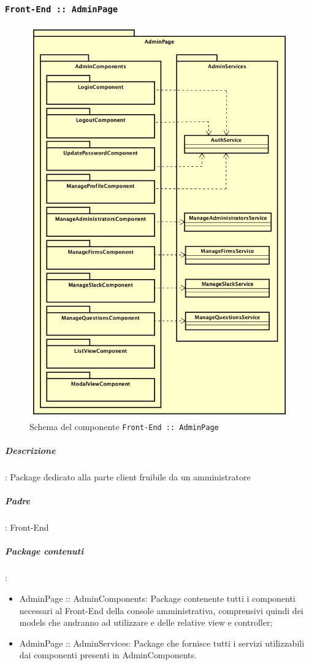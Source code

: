 \documentclass[../DefinizioneDiProdotto_v3.0.0.tex]{subfiles}
\begin{document}
	\clearpage
	\subsubsection{\texttt{Front-End :: AdminPage}}
	\begin{figure}[!h]
		\centering
		\includegraphics[scale=0.45]{Architettura/Front-End/AdminPage/AdminPage.png}
		\caption{Schema del componente \texttt{Front-End :: AdminPage}}
	\end{figure}
			\subparagraph{Descrizione}: Package dedicato alla parte client fruibile da un amministratore
			\subparagraph{Padre}: Front-End
			\subparagraph{Package contenuti}:
			\begin{itemize}
				\item AdminPage :: AdminComponents: Package contenente tutti i componenti necessari al Front-End della console amministrativa, comprensivi quindi dei models che andranno ad utilizzare e delle relative view e controller;
				\item AdminPage :: AdminServices: Package che fornisce tutti i servizi utilizzabili dai componenti presenti in AdminComponents.
			\end{itemize}
\end{document}
